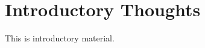 \documentclass[notes]{subfiles}
\begin{document}
\chapter*{Introductory Thoughts}
\label{chap:intro}
This is introductory material.
  
\end{document}
